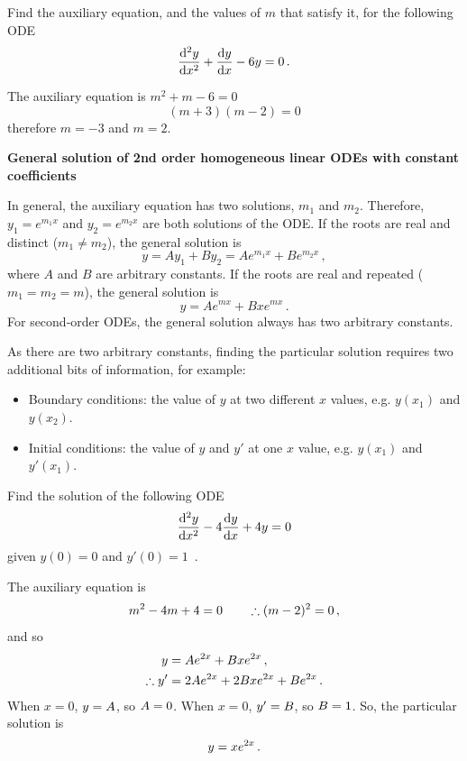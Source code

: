 \goodbreak
\begin{example}[DIY]
\label{ex:661}

Find the auxiliary equation, and the values of $m$ that satisfy it, for the following ODE
\[
\frac{{\rm d} ^2y}{{\rm d} x^2}+\frac{{\rm d} y}{{\rm d} x}-6y=0 \, .
\]

\end{example}
\begin{blanksol}

The auxiliary equation is $ {m}^{2}+m-6=0$
\[
(m+3)(m-2)=0
\]
therefore $m=-3$ and $m=2$.
\vspace{8mm}
\end{blanksol}

\textbf{General solution of 2nd order homogeneous linear ODEs with constant coefficients}

In general, the auxiliary equation has two solutions, ${m}_{1}$ and ${m}_{2}$. Therefore, ${y}_{1}={e}^{{m}_{1}x}$ and ${y}_{2}={e}^{{m}_{2}x}$ are both solutions of the ODE. If the roots are real and distinct (${m}_{1}\neq {m}_{2}$), the general solution is
\[
y=A{y}_{1}+B{y}_{2}=A{e}^{{m}_{1}x}+B{e}^{{m}_{2}x} \, ,
\]
where $A$ and $B$ are arbitrary constants. If the roots are real and repeated (${m}_{1}={m}_{2}=m$), the general solution is
\[
y=A{e}^{mx}+B{xe}^{mx} \, .
\]
For second-order ODEs, the general solution always has two arbitrary constants.

As there are two arbitrary constants, finding the particular solution requires two additional bits of information, for example:
\begin{itemize}
\item Boundary conditions: the value of $y$ at two different $x$ values, e.g. $y(x_1)$ and $y(x_2)$.
\item Initial conditions: the value of $y$ and $y'$ at one $x$ value, e.g. $y(x_1)$ and $y'(x_1)$.
\end{itemize}


\goodbreak
\begin{example}[Lecture]
\label{ex:662}
Find the solution of the following ODE
\[
\frac{{\rm d} ^2y}{{\rm d} x^2}-4\frac{{\rm d} y}{{\rm d} x}+4y=0
\]
given $y(0)=0$ and $y'(0)=1$\, .
\end{example}
\begin{solution}
The auxiliary equation is
\[
m^2-4m+4=0\qquad\therefore(m-2)^2=0\, ,
\]
and so
\begin{align*}
y&=Ae^{2x}+Bxe^{2x}\, ,\\
\therefore y'&=2Ae^{2x}+2Bxe^{2x}+Be^{2x}\, .
\end{align*}
When $x=0$, $y=A$, so $A=0$. When $x=0$, $y'=B$, so $B=1$. So, the particular solution is
\[
y=xe^{2x} \, .
\]
\end{solution}

